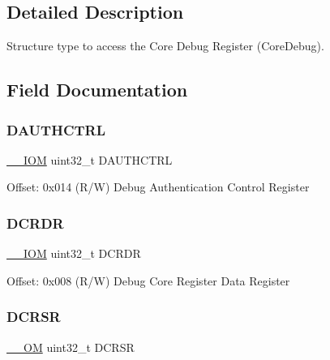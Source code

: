 \subsection{Detailed Description}
Structure type to access the Core Debug Register (Core\+Debug). 

\subsection{Field Documentation}
\mbox{\label{struct_core_debug___type_a65047e5b8051fa0c84200f8229a155b3}} 
\subsubsection{\texorpdfstring{D\+A\+U\+T\+H\+C\+T\+RL}{DAUTHCTRL}}
{\footnotesize\ttfamily \mbox{\hyperlink{core__cm4_8h_ab6caba5853a60a17e8e04499b52bf691}{\+\_\+\+\_\+\+I\+OM}} uint32\+\_\+t D\+A\+U\+T\+H\+C\+T\+RL}

Offset\+: 0x014 (R/W) Debug Authentication Control Register \mbox{\label{struct_core_debug___type_ad1dbd0dd98b6d9327f70545e0081ddbf}} 
\subsubsection{\texorpdfstring{D\+C\+R\+DR}{DCRDR}}
{\footnotesize\ttfamily \mbox{\hyperlink{core__cm4_8h_ab6caba5853a60a17e8e04499b52bf691}{\+\_\+\+\_\+\+I\+OM}} uint32\+\_\+t D\+C\+R\+DR}

Offset\+: 0x008 (R/W) Debug Core Register Data Register \mbox{\label{struct_core_debug___type_ab74a9ec90ad18e4f7a20362d362b754a}} 
\subsubsection{\texorpdfstring{D\+C\+R\+SR}{DCRSR}}
{\footnotesize\ttfamily \mbox{\hyperlink{core__cm4_8h_a0ea2009ed8fd9ef35b48708280fdb758}{\+\_\+\+\_\+\+OM}} uint32\+\_\+t D\+C\+R\+SR}

